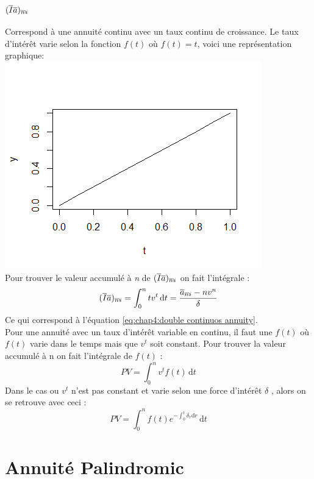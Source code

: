 \documentclass[11pt,french]{report}
\makeatletter
\DeclareRobustCommand{\annuity}[1]{%
\def\arraystretch{0}%
\setlength\arraycolsep{.7pt}%
\setlength\arrayrulewidth{.3pt}%
\begin{array}[b]{@{}c|}\hline
\\[\arraycolsep]%
\scriptstyle #1%
\end{array}%
}
\makeatother
\begin{document}
\subsubsection{$(\overline{I}\overline{a})_{\annuity{n}i}$}
Correspond à une annuité continu avec un taux continu de croissance. Le taux d'intérêt varie selon la fonction $f(t)$ où $f(t) =t$, voici une représentation graphique:
\\
\includegraphics[scale=0.60]{picture7.png} 
\\
Pour trouver le valeur accumulé à \textit{n} de $(\overline{I}\overline{a})_{\annuity{n}i}$ on fait l'intégrale :
\begin{equation}
(\overline{I}\overline{a})_{\annuity{n}i} = \int_{0}^{n} tv^{t} \, \mathrm{d}t = \frac{\overline{a}_{\annuity{n}i} - nv^{n}}{\delta}
\end{equation}
Ce qui correspond à l'équation \ref{eq:chap4:double continuos annuity}.
\\
Pour une annuité avec un taux d'intérêt variable en continu, il faut une $f(t)$ où $f(t)$ varie dans le temps mais que $v^t$ soit constant. Pour trouver la valeur accumulé à n on fait l'intégrale de $f(t)$ :
\begin{equation}
PV = \int_{0}^{n} v^{t}f(t) \, \mathrm{d}t
\end{equation}
Dans le cas ou $v^t$ n'est pas constant et varie selon une force d'intérêt $\delta$ , alors on se retrouve avec ceci :
\begin{equation}
PV = \int_{0}^{n} f(t)e^{-\int_{0}^{t} \delta_r \mathrm{d}r} \, \mathrm{d}t
\end{equation}

\section{Annuité Palindromic}
\label{sec:palindromic}
\end{document}
